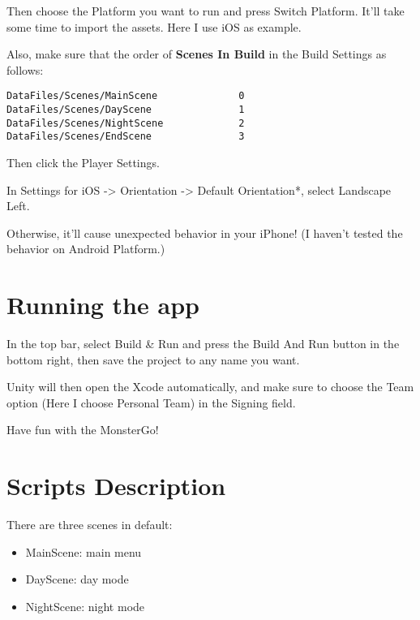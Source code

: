 \documentclass{article}
\newcommand{\tb}{\textbf}
\begin{document}
Then choose the Platform you want to run and press Switch Platform. It'll take some time to import the assets. Here I use iOS as example.

Also, make sure that the order of \tb{Scenes In Build} in the Build Settings as follows:

\begin{lstlisting}
DataFiles/Scenes/MainScene              0
DataFiles/Scenes/DayScene               1
DataFiles/Scenes/NightScene             2
DataFiles/Scenes/EndScene               3
\end{lstlisting}

Then click the Player Settings.

In Settings for iOS -> Orientation -> Default Orientation*, select Landscape Left.

Otherwise, it'll cause unexpected behavior in your iPhone! (I haven't tested the behavior on Android Platform.)

\section*{Running the app}

In the top bar, select Build \& Run and press the Build And Run button in the bottom right, then save the project to any name you want.

Unity will then open the Xcode automatically, and make sure to choose the Team option (Here I choose Personal Team) in the Signing field.

Have fun with the MonsterGo!

\section*{Scripts Description}

There are three scenes in default:

\begin{itemize}
    \item MainScene: main menu
    \item DayScene: day mode
    \item NightScene: night mode
\end{itemize}
\end{document}
